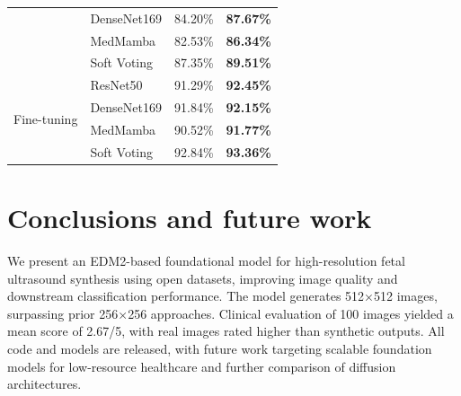 \documentclass[runningheads]{llncs}
\begin{document}
\begin{table}[htbp]
\begin{minipage}{0.56\textwidth}
\begin{tabular}{llcc}
      & DenseNet169  & 84.20\%  & \bf 87.67\% \\
      & MedMamba     & 82.53\%  & \bf 86.34\% \\
      & Soft Voting  & 87.35\%  & \bf 89.51\% \\
      \midrule
      \multirow{4}{*}{Fine-tuning}
      & ResNet50     & 91.29\% & \bf 92.45\% \\
      & DenseNet169  &  91.84\% & \bf 92.15\% \\
      & MedMamba     & 90.52\% & \bf 91.77\% \\
      & Soft Voting  & 92.84\% & \bf 93.36\% \\
      \bottomrule
    \end{tabular}
  \end{minipage}
\end{table}



\vspace{-12mm}
\section{Conclusions and future work}
We present an EDM2-based foundational model for high-resolution fetal ultrasound synthesis using open datasets, improving image quality and downstream classification performance. The model generates 512×512 images, surpassing prior 256×256 approaches. Clinical evaluation of 100 images yielded a mean score of 2.67/5, with real images rated higher than synthetic outputs. All code and models are released, with future work targeting scalable foundation models for low-resource healthcare and further comparison of diffusion architectures.

\end{document}

